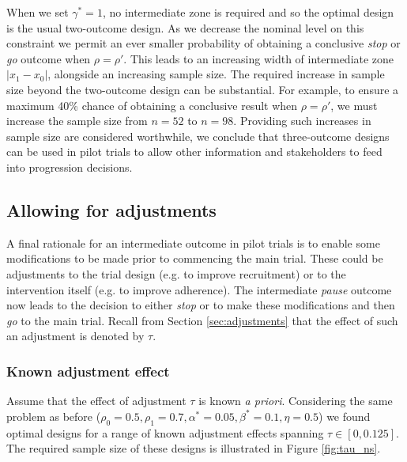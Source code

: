 \documentclass{bmcart}
\begin{document}
When we set $\gamma^* = 1$, no intermediate zone is required and so the optimal design is the usual two-outcome design. As we decrease the nominal level on this constraint we permit an ever smaller probability of obtaining a conclusive \emph{stop} or \emph{go} outcome when $\rho = \rho'$. This leads to an increasing width of intermediate zone $|x_1 - x_0|$, alongside an increasing sample size. The required increase in sample size beyond the two-outcome design can be substantial. For example, to ensure a maximum 40\% chance of obtaining a conclusive result when $\rho = \rho'$, we must increase the sample size from $n = 52$ to $n = 98$. Providing such increases in sample size are considered worthwhile, we conclude that three-outcome designs can be used in pilot trials to allow other information and stakeholders to feed into progression decisions.

\subsection{Allowing for adjustments}


A final rationale for an intermediate outcome in pilot trials is to enable some modifications to be made prior to commencing the main trial. These could be adjustments to the trial design (e.g. to improve recruitment) or to the intervention itself (e.g. to improve adherence). The intermediate \emph{pause} outcome now leads to the decision to either \emph{stop} or to make these modifications and then \emph{go} to the main trial. Recall from Section \ref{sec:adjustments} that the effect of such an adjustment is denoted by $\tau$.

\subsubsection{Known adjustment effect}

Assume that the effect of adjustment $\tau$ is known \emph{a priori}. Considering the same problem as before ($\rho_0 = 0.5, \rho_1 = 0.7, \alpha^* = 0.05, \beta^* = 0.1, \eta = 0.5$) we found optimal designs for a range of known adjustment effects spanning $\tau \in [0, 0.125]$. The required sample size of these designs is illustrated in Figure \ref{fig:tau_ns}. 
\end{document}
